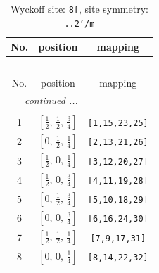 \documentclass[fleqn,8pt]{jsarticle}
\begin{document}
\begin{longtable}{ccc}
\caption{Wyckoff site: {\tt 8f}, site symmetry: {\tt ..2'/m}}
 \\
 \hline \hline
No. & position & mapping \\ \hline \endfirsthead

\multicolumn{2}{l}{\tablename\ \thetable{}} \\
 \hline \hline
No. & position & mapping \\ \hline \endhead

 \hline \hline
\multicolumn{2}{r}{\footnotesize\it continued ...} \\ \endfoot

 \hline \hline
\multicolumn{2}{r}{} \\ \endlastfoot

1 & $\left[ \frac{1}{2},\, \frac{1}{2},\, \frac{3}{4} \right]$ & {\tt [1,15,23,25]} \\ \hline
2 & $\left[ 0,\, \frac{1}{2},\, \frac{1}{4} \right]$ & {\tt [2,13,21,26]} \\ \hline
3 & $\left[ \frac{1}{2},\, 0,\, \frac{1}{4} \right]$ & {\tt [3,12,20,27]} \\ \hline
4 & $\left[ \frac{1}{2},\, 0,\, \frac{3}{4} \right]$ & {\tt [4,11,19,28]} \\ \hline
5 & $\left[ 0,\, \frac{1}{2},\, \frac{3}{4} \right]$ & {\tt [5,10,18,29]} \\ \hline
6 & $\left[ 0,\, 0,\, \frac{3}{4} \right]$ & {\tt [6,16,24,30]} \\ \hline
7 & $\left[ \frac{1}{2},\, \frac{1}{2},\, \frac{1}{4} \right]$ & {\tt [7,9,17,31]} \\ \hline
8 & $\left[ 0,\, 0,\, \frac{1}{4} \right]$ & {\tt [8,14,22,32]} \\
\end{longtable}
\renewcommand{\arraystretch}{1.2}
\end{document}
